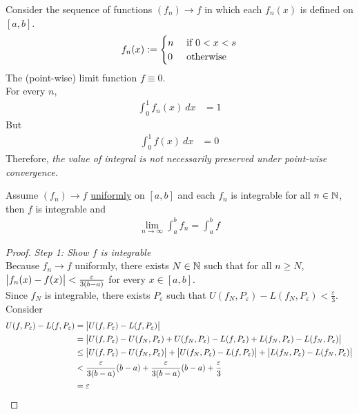 \documentclass[11pt]{article}
\begin{document}
	\begin{example}
		Consider the sequence of functions $(f_n) \to f$ in which each $f_n(x)$ is defined on $[a, b]$.
		\begin{align}
			f_n(x) := \begin{cases}
				n &\text{{ if }} 0 < x < s \\
				0 &\text{{ otherwise}}
			\end{cases}
		\end{align}
		The (point-wise) limit function $f \equiv 0$. \\
		For every $n$,
		\begin{align}
			\int_0^1 f_n(x)\ dx &= 1
		\end{align}
		But 
		\begin{align}
			\int_0^1 f(x)\ dx &= 0
		\end{align}
		Therefore, \emph{the value of integral is not necessarily preserved under point-wise convergence.}
	\end{example}
	
	\begin{theorem}
		Assume $(f_n) \to f$ \ul{uniformly} on $[a, b]$ and each $f_n$ is integrable for all $n \in \mathbb{N}$, then $f$ is integrable and 
		\begin{align}
			\lim_{n \to \infty} \int_a^b f_n = \int_a^b f	
		\end{align}
	\end{theorem}
	
	\begin{proof}
		\emph{Step 1: Show $f$ is integrable} \\
		Because $f_n \to f$ uniformly, there exists $N \in \mathbb{N}$ such that for all $n \geq N$, $\big \vert {f_n(x) - f(x)} \big \vert < \frac{\varepsilon}{3(b-a)}$ for every $x \in [a, b]$. \\
		Since $f_N$ is integrable, there exists $P_\varepsilon$ such that $U(f_N, P_\varepsilon) - L(f_N, P_\varepsilon) < \frac{\varepsilon}{3}$. \\
		Consider
		\begin{align}
			U(f, P_\varepsilon) - L(f, P_\varepsilon) &= \big \vert {U(f, P_\varepsilon) - L(f, P_\varepsilon)} \big \vert \\
			&= \big \vert {U(f, P_\varepsilon) - U(f_N, P_\varepsilon) + U(f_N, P_\varepsilon)
			- L(f, P_\varepsilon) + L(f_N, P_\varepsilon) - L(f_N, P_\varepsilon)
			} \big \vert \\
			&\leq \big \vert {U(f, P_\varepsilon) - U(f_N, P_\varepsilon)} \big \vert
			+ \big \vert {U(f_N, P_\varepsilon) - L(f, P_\varepsilon)} \big \vert
			+ \big \vert {L(f_N, P_\varepsilon) - L(f_N, P_\varepsilon)} \big \vert \\
			&< \frac{\varepsilon}{3(b-a)}(b-a) + \frac{\varepsilon}{3(b-a)}(b-a) + \frac{\varepsilon}{3} \\
			&= \varepsilon
		\end{align}
	\end{proof}
	
\end{document}
